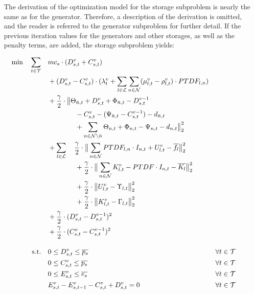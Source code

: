 The derivation of the optimization model for the storage subproblem is nearly the same as for the generator. Therefore, a description of the derivation is omitted, and the reader is referred to the generator subproblem for further detail. If the previous iteration values for the generators and other storages, as well as the penalty terms, are added, the storage subproblem yields:

 \begin{subequations}
	\begin{align}
		 \min \quad \sum_{t\in\mathcal{T}} \quad & mc_s \cdot (D_{s,t}^v + C_{s,t}^v)\label{eq:sub:stor}\\
		 & + (D_{s,t}^v - C_{s,t}^v) \cdot (\lambda_t^v + \sum_{l \in \mathcal{L}} \sum_{n \in \mathcal{N}} (\mu_{l,t}^v - \rho_{l,t}^v) \cdot PTDF_{l,n}) \nonumber \\ 
		 & + \frac{\gamma}{2} \cdot \big\| \Theta_{\breve{n},t} + D_{s,t}^v + \Phi_{\breve{n},t} - D_{s,t}^{v-1} \nonumber \\
		 & \qquad \qquad - C_{s,t}^v - (\Psi_{\breve{n},t} - C_{s,t}^{v-1}) - d_{\breve{n},t} \nonumber \\
		 & \qquad \qquad + \sum_{n \in \mathcal{N} \setminus \breve{n}} \Theta_{n,t} + \Phi_{n,t} - \Psi_{n,t} - d_{n,t} \big\|^2_2 \nonumber \\
		 & + \sum_{l \in \mathcal{L}} \quad \frac{\gamma}{2} \cdot \big\| \sum_{n \in \mathcal{N}} PTDF_{l,n} \cdot I_{n,t} + U_{l,t}^v - \overline{f_l}\big\|^2_2 \nonumber \\
		 & \qquad \qquad + \frac{\gamma}{2} \cdot \big\| \sum_{n \in \mathcal{N}} K_{l,t}^v - PTDF \cdot I_{n,t} - \overline{K_l}\big\|^2_2\nonumber \\
		 & \qquad \qquad + \frac{\gamma}{2} \cdot \big\|U_{l,t}^v - \Upsilon_{l,t}  \big\|^2_2 \nonumber\\
		 & \qquad \qquad + \frac{\gamma}{2} \cdot \big\|K_{l,t}^v - \Gamma_{l,t}  \big\|^2_2 \nonumber \\
		 & + \frac{\gamma}{2} \cdot (D_{s,t}^v - D_{s,t}^{v-1} )^2 \nonumber \\
		 & + \frac{\gamma}{2} \cdot (C_{s,t}^v - C_{s,t}^{v-1} )^2 \nonumber \\[10pt]
		 \text{s.t.} \quad & 0 \leq D_{s,t}^v \leq \overline{p_s} && \forall t \in \mathcal{T} \\
		 & 0 \leq C_{s,t}^v \leq \overline{p_s} && \forall t \in \mathcal{T}\\
		 & 0 \leq E_{s,t}^v \leq \overline{e_s} && \forall t \in \mathcal{T}\\
		 & E_{s,t}^v - E_{s,t-1}^v - C_{s,t}^v + D_{s,t}^v = 0 && \forall t \in \mathcal{T}
	\end{align}
\end{subequations}

